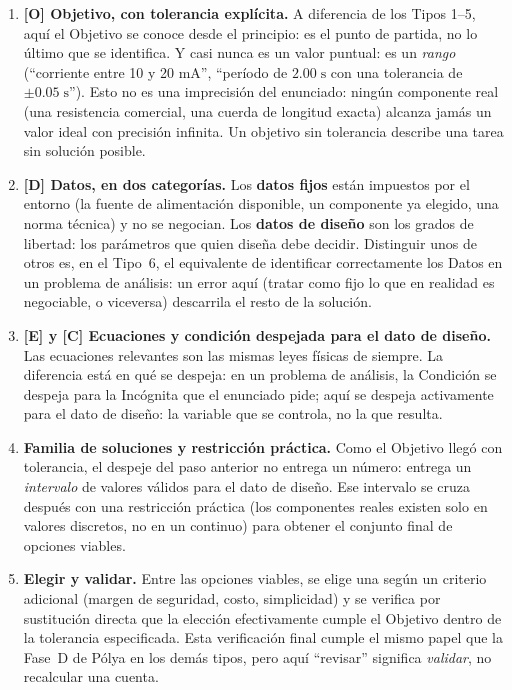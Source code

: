 \documentclass[11pt]{book}
\begin{document}
\begin{enumerate}
    \item[1.] {\bf [O] Objetivo, con tolerancia explícita.} A diferencia de los Tipos 1--5, aquí el Objetivo se conoce desde el principio: es el punto de partida, no lo último que se identifica. Y casi nunca es un valor puntual: es un {\it rango} (``corriente entre 10 y 20 mA'', ``período de $2.00\;\text{s}$ con una tolerancia de $\pm 0.05\;\text{s}$''). Esto no es una imprecisión del enunciado: ningún componente real (una resistencia comercial, una cuerda de longitud exacta) alcanza jamás un valor ideal con precisión infinita. Un objetivo sin tolerancia describe una tarea sin solución posible.

    \item[2.] {\bf [D] Datos, en dos categorías.} Los {\bf datos fijos} están impuestos por el entorno (la fuente de alimentación disponible, un componente ya elegido, una norma técnica) y no se negocian. Los {\bf datos de diseño} son los grados de libertad: los parámetros que quien diseña debe decidir. Distinguir unos de otros es, en el Tipo~6, el equivalente de identificar correctamente los Datos en un problema de análisis: un error aquí (tratar como fijo lo que en realidad es negociable, o viceversa) descarrila el resto de la solución.

    \item[3.] {\bf [E] y [C] Ecuaciones y condición despejada para el dato de diseño.} Las ecuaciones relevantes son las mismas leyes físicas de siempre. La diferencia está en qué se despeja: en un problema de análisis, la Condición se despeja para la Incógnita que el enunciado pide; aquí se despeja activamente para el dato de diseño: la variable que se controla, no la que resulta.

    \item[4.] {\bf Familia de soluciones y restricción práctica.} Como el Objetivo llegó con tolerancia, el despeje del paso anterior no entrega un número: entrega un {\it intervalo} de valores válidos para el dato de diseño. Ese intervalo se cruza después con una restricción práctica (los componentes reales existen solo en valores discretos, no en un continuo) para obtener el conjunto final de opciones viables.

    \item[5.] {\bf Elegir y validar.} Entre las opciones viables, se elige una según un criterio adicional (margen de seguridad, costo, simplicidad) y se verifica por sustitución directa que la elección efectivamente cumple el Objetivo dentro de la tolerancia especificada. Esta verificación final cumple el mismo papel que la Fase~D de Pólya en los demás tipos, pero aquí ``revisar'' significa {\it validar}, no recalcular una cuenta.
\end{enumerate}
\end{document}
